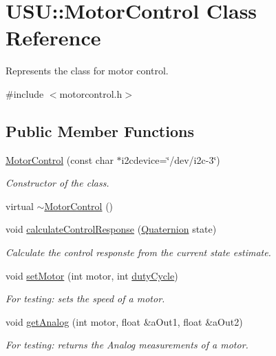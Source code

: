 \hypertarget{class_u_s_u_1_1_motor_control}{\section{\-U\-S\-U\-:\-:\-Motor\-Control \-Class \-Reference}
\label{class_u_s_u_1_1_motor_control}
}


\-Represents the class for motor control.  




{\ttfamily \#include $<$motorcontrol.\-h$>$}

\subsection*{\-Public \-Member \-Functions}
\begin{DoxyCompactItemize}
\item 
\hyperlink{class_u_s_u_1_1_motor_control_aeb90cba1220e8558b170ed1637f8fc90}{\-Motor\-Control} (const char $\ast$i2cdevice=\char`\"{}/dev/i2c-\/3\char`\"{})
\begin{DoxyCompactList}\small\item\em \-Constructor of the class. \end{DoxyCompactList}\item 
virtual \hyperlink{class_u_s_u_1_1_motor_control_a5bc78d24ed52a012a3f81cd3b62216f3}{$\sim$\-Motor\-Control} ()
\item 
void \hyperlink{class_u_s_u_1_1_motor_control_a40b7e40ce5bfb7fb0dea6c0a75d1eb5e}{calculate\-Control\-Response} (\hyperlink{class_u_s_u_1_1_quaternion}{\-Quaternion} state)
\begin{DoxyCompactList}\small\item\em \-Calculate the control responste from the current state estimate. \end{DoxyCompactList}\item 
void \hyperlink{class_u_s_u_1_1_motor_control_ad08369ed288a7816de1b3c423684f0da}{set\-Motor} (int motor, int \hyperlink{motor-example_8cpp_a839337b9ba74aba4916f05f8676a90c0}{duty\-Cycle})
\begin{DoxyCompactList}\small\item\em \-For testing\-: sets the speed of a motor. \end{DoxyCompactList}\item 
void \hyperlink{class_u_s_u_1_1_motor_control_a3304fd7022bf2468859a0d2edae0e2f0}{get\-Analog} (int motor, float \&a\-Out1, float \&a\-Out2)
\begin{DoxyCompactList}\small\item\em \-For testing\-: returns the \-Analog measurements of a motor. \end{DoxyCompactList}\end{DoxyCompactItemize}


